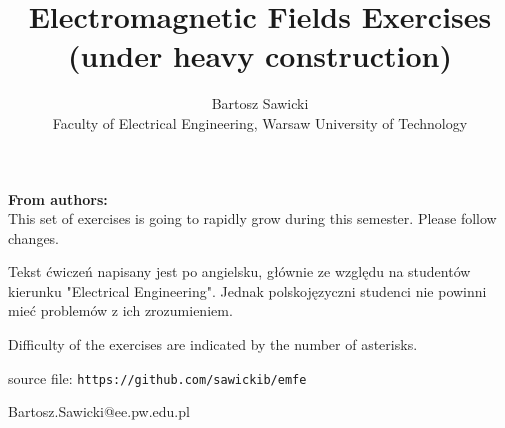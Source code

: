 \documentclass[10pt,a4paper]{article}
\title{Electromagnetic Fields Exercises\\ \vspace{0.5cm} \large{(under heavy construction)}}
\author{Bartosz Sawicki \\ \small{Faculty of Electrical Engineering, Warsaw University of Technology}}
\begin{document}
\maketitle

\noindent\textbf{From authors:}\\
This set of exercises is going to rapidly grow during this semester. Please follow changes. 

Tekst ćwiczeń napisany jest po angielsku, głównie ze względu na studentów kierunku "Electrical Engineering". Jednak polskojęzyczni studenci nie powinni mieć problemów z ich zrozumieniem.

Difficulty of the exercises are indicated by the number of asterisks. 

source file: \verb+https://github.com/sawickib/emfe+

\vspace{0.3cm}
\begin{flushright}
Bartosz.Sawicki@ee.pw.edu.pl
\end{flushright}

\tableofcontents




\end{document}
